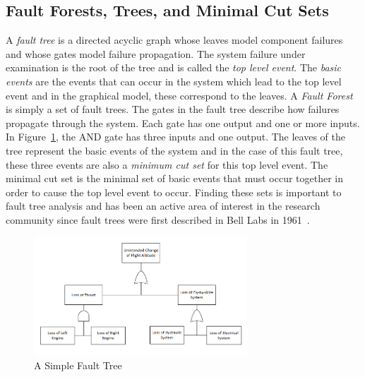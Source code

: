 \subsection{Fault Forests, Trees, and Minimal Cut Sets}
\label{sec:saArtifacts}

A \emph{fault tree} is a directed acyclic graph whose leaves model component failures and whose gates model failure propagation. The system failure under examination is the root of the tree and is called the \emph{top level event}. The \emph{basic events} are the events that can occur in the system which lead to the top level event and in the graphical model, these correspond to the leaves. A {\em Fault Forest} is simply a set of fault trees. The gates in the fault tree describe how failures propagate through the system. Each gate has one output and one or more inputs. In Figure~\ref{fig:introFT}, the AND gate has three inputs and one output. The leaves of the tree represent the basic events of the system and in the case of this fault tree, these three events are also a \textit{minimum cut set} for this top level event. The minimal cut set is the minimal set of basic events that must occur together in order to cause the top level event to occur. Finding these sets is important to fault tree analysis and has been an active area of interest in the research community since fault trees were first described in Bell Labs in 1961~\cite{historyFTA, 0f356f05e72f43018211b36f97c8854a}. 

\begin{figure}[h]
\begin{center}
\includegraphics[width=8cm]{images/ft.png}
\caption{A Simple Fault Tree} \label{fig:introFT}
\end{center}
\end{figure}

